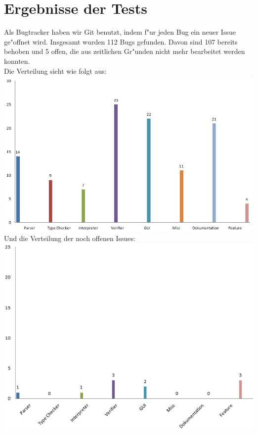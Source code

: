 \documentclass[10pt,a4paper,titlepage]{article}
\begin{document}
\section{Ergebnisse der Tests}
Als Bugtracker haben wir Git benutzt, indem f"ur jeden Bug ein neuer Issue ge"offnet wird. Insgesamt wurden 112 Bugs gefunden. Davon sind 107 bereits behoben und 5 offen, die aus zeitlichen Gr"unden nicht mehr bearbeitet werden konnten. \\[0.5cm]
Die Verteilung sieht wie folgt aus: \\[0.2cm]
\includegraphics[width=18cm]{images/closed} \\
Und die Verteilung der noch offenen Issues: \\
\includegraphics[width=15cm]{images/open}
\end{document}
